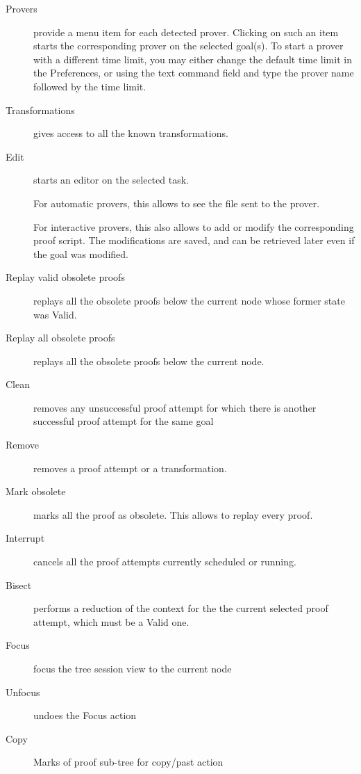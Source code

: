 \begin{description}
\begin{description}
\item[Provers] provide a menu item for each detected prover. Clicking on
  such an item starts the corresponding prover on the selected
  goal(s). To start a prover with a different time limit, you may
  either change the default time limit in the Preferences, or using
  the text command field and type the prover name followed by the time
  limit.

\item[Transformations] gives access to all the known transformations.

\item[Edit] starts an editor on the selected task.

  For automatic provers, this allows to see the file sent to the
  prover.

  For interactive provers, this also allows to add or modify the
  corresponding proof script. The modifications are saved, and can be
  retrieved later even if the goal was modified.

\item[Replay valid obsolete proofs] replays all the obsolete proofs below the current node whose former state was Valid.

\item[Replay all obsolete proofs] replays all the obsolete proofs below the current node.

\item[Clean] removes any unsuccessful proof attempt for which there is
  another successful proof attempt for the same goal

\item[Remove] removes a proof attempt or a transformation.

\item[Mark obsolete] marks all the proof as
  obsolete.  This allows to replay every proof.

\item[Interrupt] cancels all the proof attempts currently scheduled or running.

\item[Bisect] performs a reduction of the context for the the current selected proof attempt, which must be a Valid one.

\item[Focus] focus the tree session view to the current node

\item[Unfocus] undoes the Focus action

\item[Copy] Marks of proof sub-tree for copy/past action


\end{description}
\end{description}
